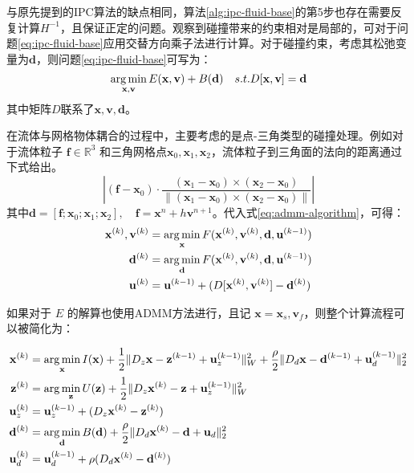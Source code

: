 与原先提到的IPC算法的缺点相同，算法\ref{alg:ipc-fluid-base}的第5步也存在需要反复计算$H^{-1}$，且保证正定的问题。观察到碰撞带来的约束相对是局部的，可对于问题\ref{eq:ipc-fluid-base}应用交替方向乘子法进行计算。对于碰撞约束，考虑其松弛变量为$\mathbf d$，则问题\ref{eq:ipc-fluid-base}可写为：
\begin{equation}
  \mathop{\arg\min}\limits_{\mathbf x, \mathbf v} E(\mathbf{x}, \mathbf{v}) + B(\mathbf{d}) \quad s.t.D [\mathbf{x},\mathbf{v}]= \mathbf{d}
\end{equation}
其中矩阵$D$联系了$\mathbf{x, v, d}$。

在流体与网格物体耦合的过程中，主要考虑的是点-三角类型的碰撞处理。例如对于流体粒子 $\mathbf{f}\in \mathbb{R}^{3}$ 和三角网格点$\mathbf{x}_{0}, \mathbf{x}_{1}, \mathbf{x}_{2}$，流体粒子到三角面的法向的距离通过下式给出。
\begin{equation}
  \left|(\mathbf{f} - \mathbf{x}_{0})\cdot \frac{(\mathbf{x}_{1} - \mathbf{x}_{0})\times (\mathbf{x}_{2} - \mathbf{x}_{0})}{\|(\mathbf{x}_{1} - \mathbf{x}_{0})\times (\mathbf{x}_{2} - \mathbf{x}_{0})\|}\right|
\end{equation}
其中$\mathbf{d} = [\mathbf{f} ; \mathbf{x}_{0}; \mathbf{x}_{1}; \mathbf{x}_{2}],\quad \mathbf{f} = \mathbf x^{n} + h\mathbf v^{n+1}$。代入式\ref{eq:admm-algorithm}，可得：
\begin{equation}
\begin{aligned}
\mathbf{x}^{(k)},\mathbf v^{(k)} &= \mathop{\arg\min}\limits_{\mathbf{x}} F(\mathbf{x}^{(k)},\mathbf{v}^{(k)}, \mathbf{d}, \mathbf u^{(k-1)})\\
\mathbf{d}^{(k)}& = \mathop{\arg\min}\limits_{\mathbf{d}} F(\mathbf{x}^{(k)},\mathbf{v}^{(k)}, \mathbf{d}, \mathbf u^{(k-1)})\\
\mathbf u^{(k)} &= \mathbf u^{(k-1)} + (D[\mathbf{x}^{(k)}, \mathbf v^{(k)}] - \mathbf{d}^{(k)})
\end{aligned}
\end{equation}

如果对于 $E$ 的解算也使用ADMM方法进行，且记 $\mathbf x = \mathbf x_s, \mathbf v_f$，则整个计算流程可以被简化为：

\begin{equation}
\begin{aligned}
\mathbf{x}^{(k)} &=\mathop{\arg\min}\limits_{\mathbf{x}} I(\mathbf{x}) + \frac{1}{2} \| D_{z} \mathbf{x} - \mathbf{z}^{(k-1)} +\mathbf{u}_{z}^{(k-1)}\|_{W}^{2} +  \frac{\rho}{2} \| D_{d} \mathbf{x} - \mathbf{d}^{(k-1)} +\mathbf{u}_{d}^{(k-1)}\|_{2}^{2}\\
\mathbf{z}^{(k)} &= \arg\min_{\mathbf{z}} U(\mathbf{z}) + \frac{1}{2} \| D_{z} \mathbf{x}^{(k)} - \mathbf{z} + \mathbf{u}_{z}^{(k-1)}\|_{W}^{2}\\
\mathbf{u}_{z}^{(k)} &=\mathbf{u}_{z}^{(k-1)}+ (D_{z} \mathbf{x}^{(k)} - \mathbf{z}^{(k)})\\
\mathbf{d}^{(k)}&=\mathop{\arg\min}\limits_{\mathbf{d}} B(\mathbf{d}) + \frac{\rho}{2} \| D_{d} \mathbf{x}^{(k)} - \mathbf{d} + \mathbf{u}_{d}\|_{2}^{2}\\
\mathbf{u}_{d}^{(k)}&=\mathbf{u}_{d}^{(k-1)} +\rho (D_{d} \mathbf{x}^{(k)} - \mathbf{d}^{(k)})
\end{aligned}
\end{equation}

